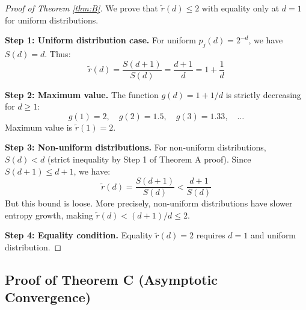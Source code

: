 \documentclass[11pt,a4paper]{article}
\theoremstyle{definition}
\theoremstyle{remark}
\newcommand{\rtilde}{\tilde{r}}
\begin{document}
\begin{proof}[Proof of Theorem \ref{thm:B}]
We prove that $\rtilde(d) \leq 2$ with equality only at $d = 1$ for uniform distributions.

\textbf{Step 1: Uniform distribution case.}
For uniform $p_j(d) = 2^{-d}$, we have $S(d) = d$. Thus:
\begin{equation}
    \rtilde(d) = \frac{S(d+1)}{S(d)} = \frac{d+1}{d} = 1 + \frac{1}{d}
\end{equation}

\textbf{Step 2: Maximum value.}
The function $g(d) = 1 + 1/d$ is strictly decreasing for $d \geq 1$:
\begin{equation}
    g(1) = 2, \quad g(2) = 1.5, \quad g(3) = 1.33, \quad \ldots
\end{equation}
Maximum value is $\rtilde(1) = 2$.

\textbf{Step 3: Non-uniform distributions.}
For non-uniform distributions, $S(d) < d$ (strict inequality by Step 1 of Theorem A proof). Since $S(d+1) \leq d+1$, we have:
\begin{equation}
    \rtilde(d) = \frac{S(d+1)}{S(d)} < \frac{d+1}{S(d)}
\end{equation}
But this bound is loose. More precisely, non-uniform distributions have slower entropy growth, making $\rtilde(d) < (d+1)/d \leq 2$.

\textbf{Step 4: Equality condition.}
Equality $\rtilde(d) = 2$ requires $d = 1$ and uniform distribution.
\end{proof}

\subsection{Proof of Theorem C (Asymptotic Convergence)}
\end{document}
